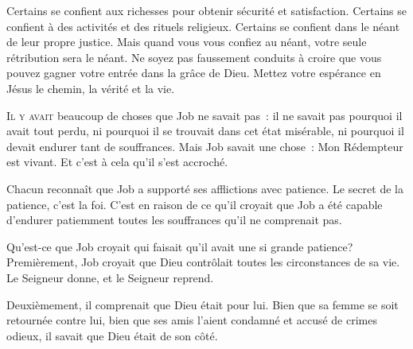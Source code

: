 Certains se confient aux richesses pour obtenir sécurité et satisfaction.
 Certains se confient à des activités et des rituels religieux.
 Certains se confient dans le néant de leur propre justice.
 Mais quand vous vous confiez au néant, votre seule rétribution sera le néant.
 Ne soyez pas faussement conduits à croire que vous pouvez gagner
 votre entrée dans la grâce de Dieu.
 Mettez votre espérance en Jésus \ocadr{}le chemin, la vérité et la vie.

\dvrule







\lettrine{I}{l y avait} beaucoup de choses que Job ne savait pas~:
 il ne savait pas pourquoi il avait tout perdu, ni pourquoi
 il se trouvait dans cet état misérable,
 ni pourquoi il devait endurer tant de souffrances.
 Mais Job savait une chose~: \Og Mon Rédempteur est vivant. \Fg{}
 Et c'est à cela qu'il s'est accroché. 

Chacun reconnaît que Job a supporté ses afflictions avec patience.
 Le secret de la patience, c'est la foi. C'est en raison de ce qu'il croyait
 que Job a été capable d'endurer patiemment toutes les souffrances
 qu'il ne comprenait pas. 


Qu'est-ce que Job croyait qui faisait qu'il avait une si grande patience?
 Premièrement, Job croyait que Dieu contrôlait toutes les circonstances
 de sa vie. Le Seigneur donne, et le Seigneur reprend. 

Deuxièmement, il comprenait que Dieu était pour lui.
 Bien que sa femme se soit retournée contre lui,
 bien que ses amis l'aient condamné et accusé de crimes odieux,
 il savait que Dieu était de son côté. 

